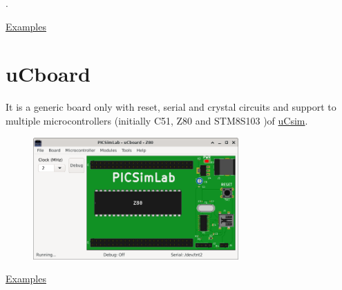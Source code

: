 .\vspace{0.5cm}

\href{https://lcgamboa.github.io/picsimlab_examples/board_Franzininho_DIY.html}{Examples}


\section{uCboard}

It is a generic board only with reset, serial and crystal circuits and support to multiple microcontrollers 
(initially C51, Z80 and STM8S103 )of \href{http://mazsola.iit.uni-miskolc.hu/\%7edrdani/embedded/ucsim/}{uCsim}.

\begin{figure}[H]
\center
\includegraphics[width=0.7\textwidth]{img/uCboard.png} 
\end{figure} 

\href{https://lcgamboa.github.io/picsimlab_examples/board_uCboard.html}{Examples}
